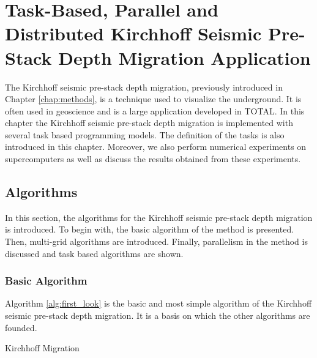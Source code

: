 \chapter{Task-Based, Parallel and Distributed Kirchhoff Seismic Pre-Stack Depth Migration Application \label{chap:exp_km}}
\graphicspath{{chapters/exp_kirchhoff/}}


The Kirchhoff seismic pre-stack depth migration, previously introduced in Chapter \ref{chap:methods}, is a technique used to visualize the underground.
It is often used in geoscience and is a large application developed in TOTAL.
In this chapter the Kirchhoff seismic pre-stack depth migration is implemented with several task based programming models.
The definition of the tasks is also introduced in this chapter.
Moreover, we also perform numerical experiments on supercomputers as well as discuss the results obtained from these experiments.

\section{Algorithms}
In this section, the algorithms for the  Kirchhoff seismic pre-stack depth migration is introduced.
To begin with, the basic algorithm of the method is presented.
Then, multi-grid algorithms are introduced.
Finally, parallelism in the method is discussed and task based algorithms are shown.

\subsection{Basic Algorithm}

Algorithm \ref{alg:first_look} is the basic and most simple algorithm of the Kirchhoff seismic pre-stack depth migration.
It is a basis on which the other algorithms are founded.


\begin{algorithm}[h]
	\DontPrintSemicolon
	\SetAlgoVlined
	\caption{Kirchhoff Migration \label{alg:first_look}}
\end{algorithm}

